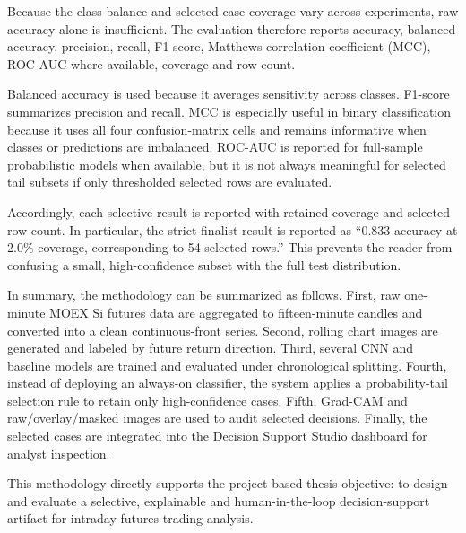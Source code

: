 Because the class balance and selected-case coverage vary across experiments, raw accuracy alone is insufficient. The evaluation therefore reports accuracy, balanced accuracy, precision, recall, F1-score, Matthews correlation coefficient (MCC), ROC-AUC where available, coverage and row count.

Balanced accuracy is used because it averages sensitivity across classes. F1-score summarizes precision and recall. MCC is especially useful in binary classification because it uses all four confusion-matrix cells and remains informative when classes or predictions are imbalanced. ROC-AUC is reported for full-sample probabilistic models when available, but it is not always meaningful for selected tail subsets if only thresholded selected rows are evaluated.

Accordingly, each selective result is reported with retained coverage and selected row count. In particular, the strict-finalist result is reported as ``0.833 accuracy at 2.0\% coverage, corresponding to 54 selected rows.'' This prevents the reader from confusing a small, high-confidence subset with the full test distribution.

In summary, the methodology can be summarized as follows. First, raw one-minute MOEX Si futures data are aggregated to fifteen-minute candles and converted into a clean continuous-front series. Second, rolling chart images are generated and labeled by future return direction. Third, several CNN and baseline models are trained and evaluated under chronological splitting. Fourth, instead of deploying an always-on classifier, the system applies a probability-tail selection rule to retain only high-confidence cases. Fifth, Grad-CAM and raw/overlay/masked images are used to audit selected decisions. Finally, the selected cases are integrated into the Decision Support Studio dashboard for analyst inspection.

This methodology directly supports the project-based thesis objective: to design and evaluate a selective, explainable and human-in-the-loop decision-support artifact for intraday futures trading analysis.
